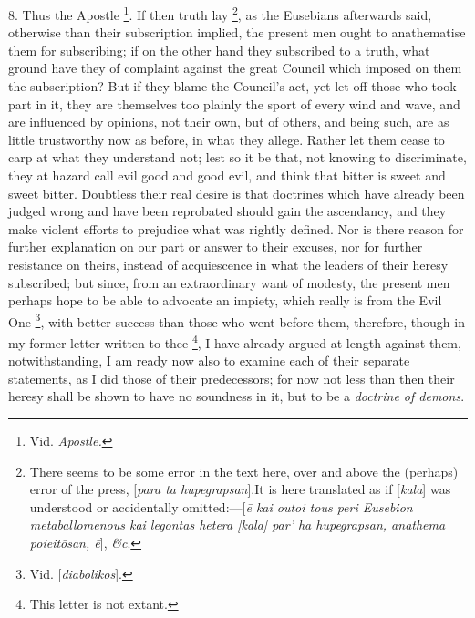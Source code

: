 8. Thus the Apostle \footnote{Vid. \emph{Apostle.}}. If then truth lay \footnote{\emph{}There seems to be some error in the text here, over and above the
(perhaps) error of the press, [\emph{para ta hupegrapsan}].\emph{}It
is here translated as if [\emph{kala}] was understood or accidentally
omitted:—[\emph{\={e} kai outoi tous peri Eusebion metaballomenous
kai legontas hetera [kala] par' ha hupegrapsan, anathema poieit\={o}san,
\={e}}], \emph{\&c}.},
as the Eusebians afterwards said, otherwise than their subscription
implied, the present men ought to anathematise them for subscribing;
if on the other hand they subscribed to a truth, what ground have they
of complaint against the great Council which imposed on them the
subscription? But if they blame the Council's act, yet let off those
who took part in it, they are themselves too plainly the sport of
every wind and wave, and are influenced by opinions, not their own,
but of others, and being such, are as little trustworthy now as
before, in what they allege. Rather let them cease to carp at what
they understand not; lest so it be that, not knowing to discriminate,
they at hazard call evil good and good evil, and think that
bitter is sweet and sweet bitter. Doubtless their real desire is that
doctrines which have already been judged wrong and have been
reprobated should gain the ascendancy, and they make violent efforts
to prejudice what was rightly defined. Nor is there reason for further
explanation on our part or answer to their excuses, nor for further
resistance on theirs, instead of acquiescence in what the leaders of
their heresy subscribed; but since, from an extraordinary want of
modesty, the present men perhaps hope to be able to advocate an
impiety, which really is from the Evil One \footnote{Vid. [\emph{diabolikos}].}, with better success than those who went before them,
therefore, though in my former letter written to thee \footnote{This letter is not extant.}, I have already argued at length against them,
notwithstanding, I am ready now also to examine each of their separate
statements, as I did those of their predecessors; for now not less
than then their heresy shall be shown to have no soundness in it, but
to be a \emph{doctrine of demons}.


